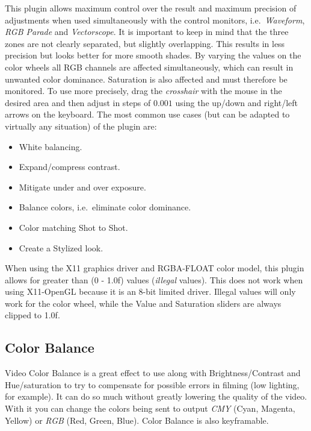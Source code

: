 This plugin allows maximum control over the result and maximum precision of adjustments when used simultaneously with the control monitors, i.e.\ \textit{Waveform}, \textit{RGB Parade} and \textit{Vectorscope}. It is important to keep in mind that the three zones are not clearly separated, but slightly overlapping. This results in less precision but looks better for more smooth shades. By varying the values on the color wheels all RGB channels are affected simultaneously, which can result in unwanted color dominance. Saturation is also affected and must therefore be monitored.
To use more precisely, drag the \textit{crosshair} with the mouse in the desired area and then adjust in steps of $0.001$ using the up/down and right/left arrows on the keyboard.
The most common use cases (but can be adapted to virtually any situation) of the plugin are:

\begin{itemize}
    \item White balancing.
    \item Expand/compress contrast.
    \item Mitigate under and over exposure.
    \item Balance colors, i.e.\ eliminate color dominance.
    \item Color matching Shot to Shot.
    \item Create a Stylized look.
\end{itemize}

When using the X11 graphics driver and RGBA-FLOAT color model, this plugin allows for greater than (0 - 1.0f) values (\textit{illegal} values). This does not work when using X11-OpenGL because it is an 8-bit limited driver. Illegal values will only work for the color wheel, while the Value and Saturation sliders are always clipped to 1.0f.

\subsection{Color Balance}%
\label{sub:color_balance}

Video Color Balance is a great effect to use along with Brightness/Contrast and Hue/saturation to try to compensate for possible errors in filming (low lighting, for example). It can do so much without greatly lowering the quality of the video. With it you can change the colors being sent to output \textit{CMY} (Cyan, Magenta, Yellow) or \textit{RGB} (Red, Green, Blue). Color Balance is also keyframable.

